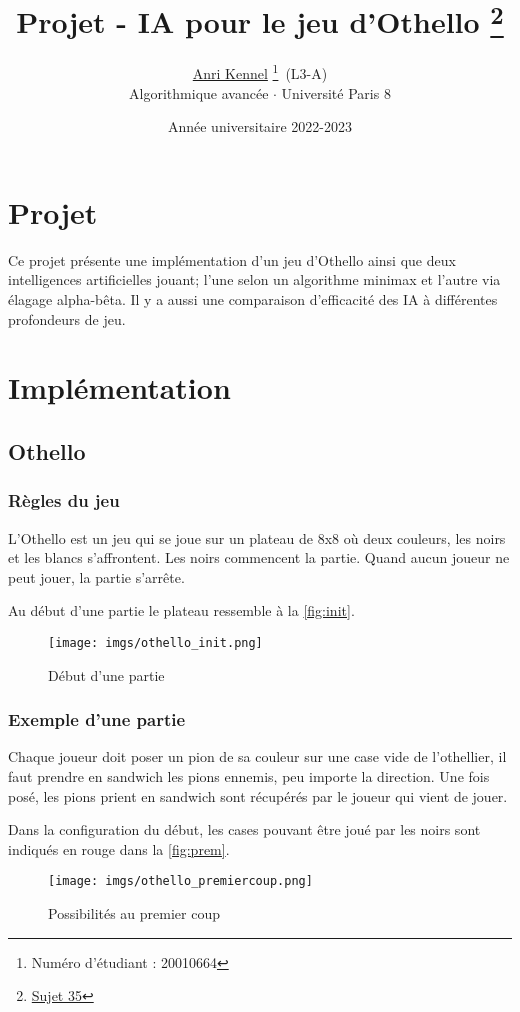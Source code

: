 \documentclass{article}
\title{Projet - IA pour le jeu d'Othello
    \thanks{\href{https://jj.up8.site/AA/ProjetsAA.pdf}{Sujet 35}}}
\author{\href{mailto:anri.kennel@etud.univ-paris8.fr}{Anri Kennel}
    \thanks{Numéro d'étudiant : 20010664}\, (L3-A)
    \\Algorithmique avancée $\cdot$ Université Paris 8}
\date{Année universitaire 2022-2023}
\begin{document}
\maketitle
\tableofcontents
\clearpage

\section{Projet}
Ce projet présente une implémentation d'un jeu d’Othello ainsi que deux
intelligences artificielles jouant; l'une selon un algorithme minimax et l'autre
via élagage alpha-bêta. Il y a aussi une comparaison d'efficacité des IA à
différentes profondeurs de jeu.

\section{Implémentation}
\subsection{Othello}
\subsubsection{Règles du jeu}
L'Othello est un jeu qui se joue sur un plateau de 8x8 où deux couleurs, les noirs
et les blancs s'affrontent. Les noirs commencent la partie. Quand aucun joueur
ne peut jouer, la partie s'arrête.

Au début d'une partie le plateau ressemble à la \autoref{fig:init}.

\begin{figure}[h]
    \centering
    \texttt{[image: imgs/othello\_init.png]}
    \caption{Début d'une partie}
    \label{fig:init}
\end{figure}

\subsubsection{Exemple d'une partie}
Chaque joueur doit poser un pion de sa couleur sur une case vide de l’othellier,
il faut prendre en sandwich les pions ennemis, peu importe la direction. Une fois
posé, les pions prient en sandwich sont récupérés par le joueur qui vient de jouer.

Dans la configuration du début, les cases pouvant être joué par les noirs sont
indiqués en rouge dans la \autoref{fig:prem}.

\begin{figure}[h]
    \centering
    \texttt{[image: imgs/othello\_premiercoup.png]}
    \caption{Possibilités au premier coup}
    \label{fig:prem}
\end{figure}
\end{document}
